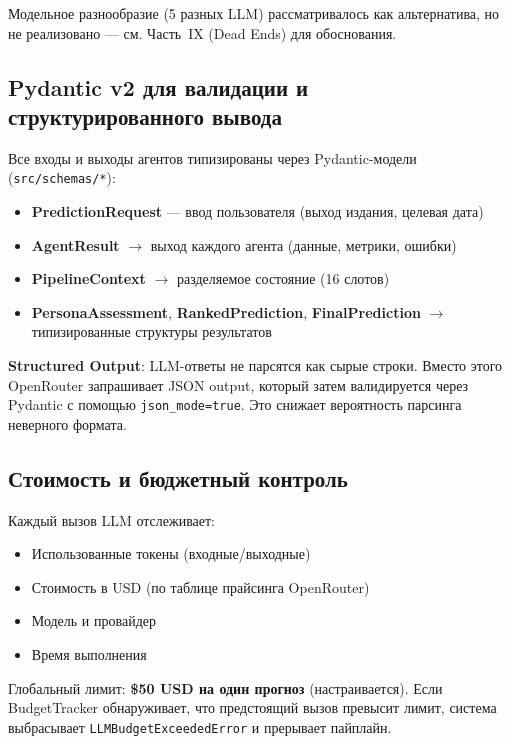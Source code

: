 \noindent Модельное разнообразие (5 разных LLM) рассматривалось как альтернатива, но не реализовано --- см. Часть~IX (Dead Ends) для обоснования.

\subsection{Pydantic v2 для валидации и структурированного вывода}


Все входы и выходы агентов типизированы через Pydantic-модели (\texttt{src/schemas/*}):

\begin{itemize}[nosep]
\item \textbf{PredictionRequest} --- ввод пользователя (выход издания, целевая дата)
\item \textbf{AgentResult} $\to$ выход каждого агента (данные, метрики, ошибки)
\item \textbf{PipelineContext} $\to$ разделяемое состояние (16 слотов)
\item \textbf{PersonaAssessment}, \textbf{RankedPrediction}, \textbf{FinalPrediction} $\to$ типизированные структуры результатов
\end{itemize}

\noindent \textbf{Structured Output}: LLM-ответы не парсятся как сырые строки. Вместо этого OpenRouter запрашивает JSON output, который затем валидируется через Pydantic с помощью \texttt{json\_mode=true}. Это снижает вероятность парсинга неверного формата.

\subsection{Стоимость и бюджетный контроль}


Каждый вызов LLM отслеживает:

\begin{itemize}[nosep]
\item Использованные токены (входные/выходные)
\item Стоимость в USD (по таблице прайсинга OpenRouter)
\item Модель и провайдер
\item Время выполнения
\end{itemize}

\noindent Глобальный лимит: \textbf{\$50 USD на один прогноз} (настраивается). Если BudgetTracker обнаруживает, что предстоящий вызов превысит лимит, система выбрасывает \texttt{LLMBudgetExceededError} и прерывает пайплайн.


